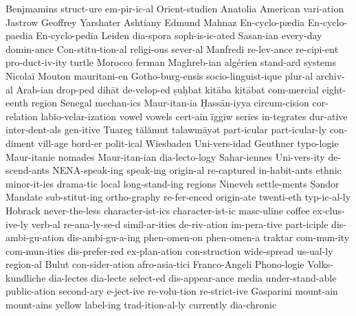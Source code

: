 {Benjmamins
struct-ure
em-pir-ic-al
Orient-studien
Anatolia
American
vari-ation
Jastrow
Geoffrey
Yarshater
Ashtiany
Edmund
Mahnaz
En-cyclo-pædia
En-cyclo-paedia
En-cyclo-pedia
Leiden
dia-spora
soph-is-ic-ated
Sasan-ian
every-day
domin-ance
Con-stitu-tion-al
religi-ous
sever-al
Manfredi
re-lev-ance
re-cipi-ent
pro-duct-iv-ity
turtle
Morocco
ferman
Maghreb-ian
algérien
stand-ard
systems
Nicolaï
Mouton
mauritani-en
Gotho-burg-ensis
socio-linguist-ique
plur-al
archiv-al
Arab-ian
drop-ped
dihāt
de-velop-ed
ṣuḥbat
kitāba
kitābat
com-mercial
eight-eenth
region
Senegal
mechan-ics
Maur-itan-ia
Ḥassān-iyya
circum-cision
cor-relation
labio-velar-ization
vowel
vowels
cert-ain
īggīw
series
in-tegrates
dur-ative
inter-dent-als
gen-itive
Tuareg
tălămut
talawmāyət
part-icular
part-icular-ly
con-diment
vill-age
bord-er
polit-ical
Wiesbaden
Uni-vers-idad
Geuthner
typo-logie
Maur-itanie
nomades
Maur-itan-ian
dia-lecto-logy
Sahar-iennes
Uni-vers-ity
de-scend-ants
NENA-speak-ing
speak-ing
origin-al
re-captured
in-habit-ants
ethnic
minor-it-ies
drama-tic
local
long-stand-ing
regions
Nineveh
settle-ments
Ṣəndor
Mandate
sub-stitut-ing
ortho-graphy
re-fer-enced
origin-ate
twenti-eth
typ-ic-al-ly
Hobrack
never-the-less
character-ist-ics
character-ist-ic
masc-uline
coffee
ex-clus-ive-ly
verb-al
re-ana-ly-se-d
simil-ar-ities
de-riv-ation
im-pera-tive
part-iciple
dis-ambi-gu-ation
dis-ambi-gu-a-ing
phen-omen-on
phen-omen-a
traktar
com-mun-ity
com-mun-ities
dis-prefer-red
ex-plan-ation
con-struction
wide-spread
us-ual-ly
region-al
Bulut
con-sider-ation
afro-asia-tici
Franco-Angeli
Phono-logie
Volks-kundliche
dia-lectes
dia-lecte
select-ed
dis-appear-ance
media
under-stand-able
public-ation
second-ary
e-ject-ive
re-volu-tion
re-strict-ive
Gasparini
mount-ain
mount-ains
yellow
label-ing
trad-ition-al-ly
currently
dia-chronic
}